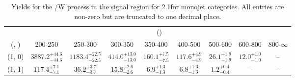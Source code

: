 \begin{table}[h!]
\tiny
\centering
\caption{Yields for the \ttbar/W process in the signal region for 2.1\ifb for monojet categories. All entries are non-zero but are truncated to one decimal place.\label{tab:yieldssep_sig_ttw_mono}}
\begin{tabular}
{ccccccccc}
	\hline\hline
	& \multicolumn{8}{c}{\scalht (\gev)} \\ 
	 (\njet,  \nb) & 200-250 & 250-300 & 300-350 & 350-400 & 400-500 & 500-600 & 600-800 & 800-$\infty$ \\ [0.8ex] 
\hline
	(1, 0) & $3887.2^{+ 44.6 }_{- 44.6 }$ & $1183.4^{+ 22.5 }_{- 22.5 }$ & $414.0^{+ 13.0 }_{- 13.0 }$ & $160.1^{+ 7.5 }_{- 7.5 }$ & $117.6^{+ 4.9 }_{- 4.9 }$ & $26.1^{+ 1.9 }_{- 1.9 }$ & $12.0^{+ 1.0 }_{- 1.0 }$ & -- \\[0.5ex] 
	(1, 1) & $117.4^{+ 7.1 }_{- 7.1 }$ & $36.2^{+ 3.7 }_{- 3.7 }$ & $15.8^{+ 2.6 }_{- 2.6 }$ & $6.9^{+ 1.3 }_{- 1.3 }$ & $6.8^{+ 1.3 }_{- 1.3 }$ & $1.2^{+ 0.4 }_{- 0.4 }$ & -- & -- \\[0.5ex] 
	\hline
	\hline
\end{tabular}
\end{table}
